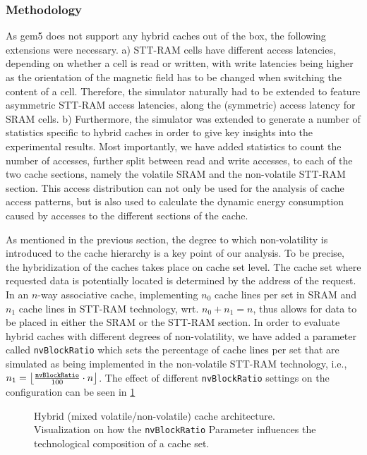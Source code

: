    
  


\subsubsection{Methodology}

As gem5 does not support any hybrid caches out of the box, the following extensions were necessary.
a) STT-RAM cells have different access latencies, depending on whether a cell is read or written, with write latencies being higher as the orientation of the magnetic field has to be changed when switching the content of a cell.
Therefore, the simulator naturally had to be extended to feature asymmetric STT-RAM access latencies, along the (symmetric) access latency for SRAM cells.
b) Furthermore, the simulator was extended to generate a number of statistics specific to hybrid caches in order to give key insights into the experimental results.
Most importantly, we have added statistics to count the number of accesses, further split between read and write accesses, to each of the two cache sections, namely the volatile SRAM and the non-volatile STT-RAM section.
This access distribution can not only be used for the analysis of cache access patterns, but is also used to calculate the dynamic energy consumption caused by accesses to the different sections of the cache.
\par
As mentioned in the previous section, the degree to which non-volatility is introduced to the cache hierarchy is a key point of our analysis.
To be precise, the hybridization of the caches takes place on cache set level.
The cache set where requested data is potentially located is determined by the address of the request.
In an $n$-way associative cache, implementing $n_0$ cache lines per set in SRAM and $n_1$ cache lines in STT-RAM technology, wrt. $n_0 + n_1 = n$, thus allows for data to be placed in either the SRAM or the STT-RAM section.
In order to evaluate hybrid caches with different degrees of non-volatility, we have added a parameter called \texttt{nvBlockRatio} which sets the percentage of cache lines per set that are simulated as being implemented in the non-volatile STT-RAM technology, i.e., $n_1 = \left\lfloor\frac{\text{\texttt{nvBlockRatio}}}{100} \cdot n\right\rfloor$.
The effect of different \texttt{nvBlockRatio} settings on the configuration can be seen in \cref{fig:FAU-nvBlockratio}
\begin{figure}
    
    \caption{Hybrid (mixed volatile/non-volatile) cache architecture. Visualization on how the \texttt{nvBlockRatio} Parameter influences the technological composition of a cache set.}
    \label{fig:FAU-nvBlockratio}
\end{figure}
